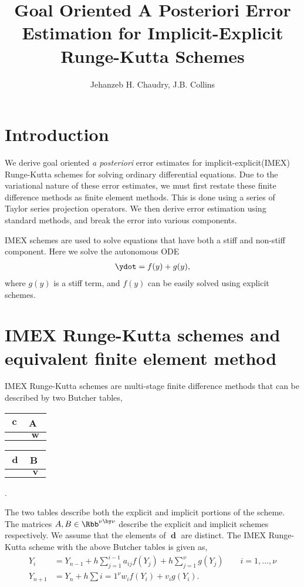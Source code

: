 \documentclass{amsart}
\begin{document}
\title{Goal Oriented A Posteriori Error Estimation for Implicit-Explicit Runge-Kutta Schemes}
\author{Jehanzeb H. Chaudry, J.B. Collins}
\maketitle


\section{Introduction}
	We derive goal oriented \emph{a posteriori} error estimates for implicit-explicit(IMEX) Runge-Kutta schemes for solving ordinary differential equations.  Due to the variational nature of these error estimates, we must first restate these finite difference methods as finite element methods.  This is done using a series of Taylor series projection operators.  We then derive error estimation using standard methods, and break the error into various components.
	
	IMEX schemes are used to solve equations that have both a stiff and non-stiff component.  Here we solve the autonomous ODE
	\begin{align}
		\ydot = f(y) + g(y),	
	\end{align}
	where $g(y)$ is a stiff term, and $f(y)$ can be easily solved using explicit schemes.

	
	
	




\section{IMEX Runge-Kutta schemes and equivalent finite element method}
	IMEX Runge-Kutta schemes are multi-stage finite difference methods that can be described by two Butcher tables,
\begin{table}[h]
\begin{tabular}{l|l}
$\mbfc$ & A           \\ \hline
      & $\mbfw$    
\end{tabular}
\hspace{.3in}
\begin{tabular}{l|l}
$\mbfd$ & B          \\ \hline
      & $\mbfv$    
\end{tabular}.
\end{table}
The two tables describe both the explicit and implicit portions of the scheme.  The matrices $A,B \in \Rbb^{\nu \by \nu}$ describe the explicit and implicit schemes respectively.  We assume that the elements of $\mbfd$ are distinct.  The IMEX Runge-Kutta scheme with the above Butcher tables is given as,
\begin{align}
	Y_i &= Y_{n-1} + h\sum_{j=1}^{i-1} a_{ij}f(Y_j) + h \sum_{j=1}^\nu g(Y_j) \qquad i = 1,\ldots,\nu \\
	Y_{n+1} &= Y_n + h\sum{i=1}^\nu w_i f(Y_i) + v_i g(Y_i).
\end{align}
\end{document}
